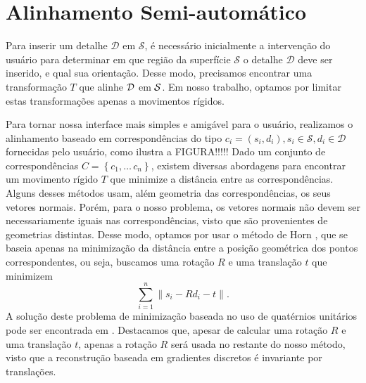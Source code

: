 \section{Alinhamento Semi-automático}
\label{sec:technique}

Para inserir um detalhe $\mathcal{D}$ em $\mathcal{S}$, é necessário inicialmente a intervenção do usuário para determinar em que região da superfície $\mathcal{S}$ o detalhe $\mathcal{D}$ deve ser inserido, e qual sua orientação. Desse modo, precisamos encontrar uma transformação $T$ que alinhe $\mathcal{D}$ em $\mathcal{S}$. Em nosso trabalho, optamos por limitar estas transformações apenas a movimentos rígidos.

Para tornar nossa interface mais simples e amigável para o usuário, realizamos o alinhamento baseado em correspondências do tipo $c_i = (s_i, d_i), s_i \in \mathcal{S}, d_i \in \mathcal{D}$ fornecidas pelo usuário, como ilustra a FIGURA!!!!! Dado um conjunto de correspondências $C=\left\{c_1,\dots\,c_n\right\}$, existem diversas abordagens para encontrar um movimento rígido $T$ que minimize a distância entre as correspondências. Alguns desses métodos usam, além geometria das correspondências, os seus vetores normais. Porém, para o nosso problema, os vetores normais não devem ser necessariamente iguais nas correspondências, visto que são provenientes de geometrias distintas. Desse modo, optamos por usar o método de Horn \cite{horn:1987}, que se baseia apenas na minimização da distância entre a posição geométrica dos pontos correspondentes, ou seja, buscamos uma rotação $R$ e uma translação $t$ que minimizem
\begin{equation}
\sum_{i=1}^n \|s_i - Rd_i - t \|.
\end{equation}
A solução deste problema de minimização baseada no uso de quatérnios unitários pode ser encontrada em \cite{horn:1987}. Destacamos que, apesar de calcular uma rotação $R$ e uma translação $t$, apenas a rotação $R$ será usada no restante do nosso método, visto que a reconstrução baseada em gradientes discretos é invariante por translações.




